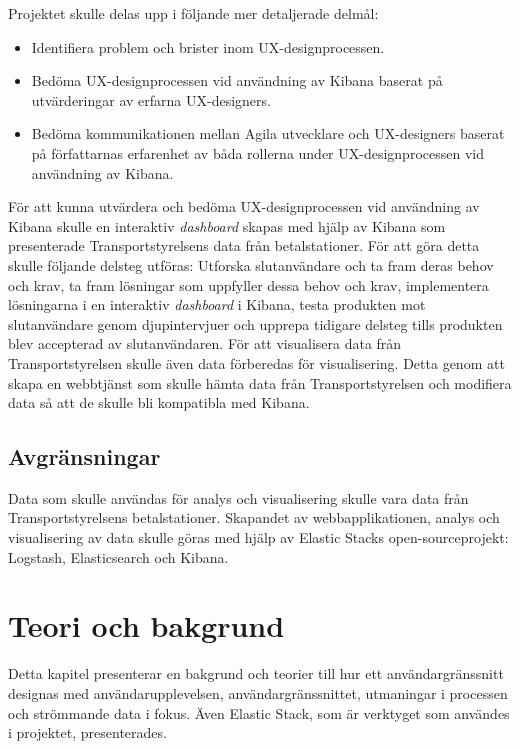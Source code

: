 \documentclass[12pt]{kththesis}
\begin{document}
Projektet skulle delas upp i följande mer detaljerade delmål:

\begin{itemize}

\item Identifiera problem och brister inom UX-designprocessen. 

\item Bedöma UX-designprocessen vid användning av Kibana baserat på utvärderingar av erfarna UX-designers.

\item Bedöma kommunikationen mellan Agila utvecklare och UX-designers baserat på författarnas erfarenhet av båda rollerna under UX-designprocessen vid användning av Kibana.
\end{itemize} 

För att kunna utvärdera och bedöma UX-designprocessen vid användning av Kibana skulle en interaktiv \textit{dashboard} skapas med hjälp av Kibana som presenterade Transportstyrelsens data från betalstationer. För att göra detta skulle följande delsteg utföras: Utforska slutanvändare och ta fram deras behov och krav, ta fram lösningar som uppfyller dessa behov och krav, implementera lösningarna i en interaktiv \textit{dashboard} i Kibana, testa produkten mot slutanvändare genom djupintervjuer och upprepa tidigare delsteg tills produkten blev accepterad av slutanvändaren. För att visualisera data från Transportstyrelsen skulle även data förberedas för visualisering. Detta genom att skapa en webbtjänst som skulle hämta data från Transportstyrelsen och modifiera data så att de skulle bli kompatibla med Kibana.

\section{Avgränsningar}
Data som skulle användas för analys och visualisering skulle vara data från Transportstyrelsens betalstationer. Skapandet av webbapplikationen, analys och visualisering av data skulle göras med hjälp av Elastic Stacks open-sourceprojekt: Logstash, Elasticsearch och Kibana. 

\afterpage{\null\newpage}

\chapter{Teori och bakgrund}

Detta kapitel presenterar en bakgrund och teorier till hur ett användargränssnitt designas med användarupplevelsen, användargränssnittet, utmaningar i processen och strömmande data i fokus. Även Elastic Stack, som är verktyget som användes i projektet, presenterades.
\end{document}
